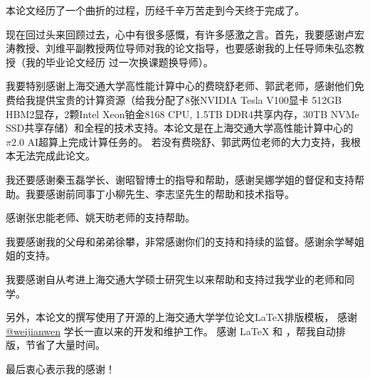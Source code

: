 
\begin{acknowledgements}
  本论文经历了一个曲折的过程，历经千辛万苦走到今天终于完成了。

  现在回过头来回顾过去，心中有很多感慨，有许多感激之言。首先，我要感谢卢宏涛教授、刘维平副教授两位导师对我的论文指导，也要感谢我的上任导师朱弘恣教授（我的毕业论文经历
  过一次换课题换导师）。

  我要特别感谢上海交通大学高性能计算中心的费晓舒老师、郭武老师，感谢他们免费给我提供宝贵的计算资源（给我分配了8张NVIDIA Tesla V100显卡 512GB HBM2显存，2颗Intel Xeon铂金8168 CPU, 
  1.5TB DDR4共享内存，30TB NVMe SSD共享存储）和全程的技术支持。本论文是在上海交通大学高性能计算中心的$\pi 2.0$ AI超算上完成计算任务的。
  若没有费晓舒、郭武两位老师的大力支持，我根本无法完成此论文。

  我还要感谢秦玉磊学长、谢昭智博士的指导和帮助，感谢吴娜学姐的督促和支持帮助。我要感谢前同事丁小柳先生、李志坚先生的帮助和技术指导。

  感谢张忠能老师、姚天昉老师的支持帮助。

  我要感谢我的父母和弟弟徐攀，非常感谢你们的支持和持续的监督。感谢余学琴姐姐的支持。

  我要感谢自从考进上海交通大学硕士研究生以来帮助和支持过我学业的老师和同学。

  另外，本论文的撰写使用了开源的\href{https://github.com/sjtug/SJTUThesis}{\sjtuthesis}上海交通大学学位论文\LaTeX{}排版模板， 
  感谢 \href{https://github.com/weijianwen}{@weijianwen} 学长一直以来的开发和维护工作。
  感谢 \LaTeX{} 和 \href{https://github.com/sjtug/SJTUThesis}{\sjtuthesis}，帮我自动排版，节省了大量时间。

  最后衷心表示我的感谢！


\end{acknowledgements}
